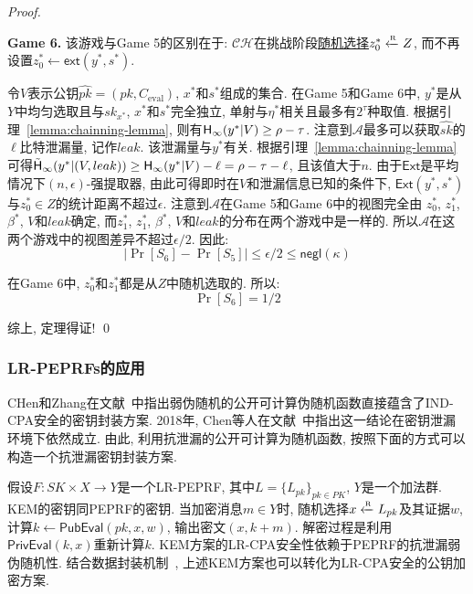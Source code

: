 \begin{proof}
\begin{trivlist}
\item \textbf{Game 6.} 该游戏与Game 5的区别在于: $\mathcal{CH}$在挑战阶段\underline{随机选择$z_0^* \xleftarrow{\textup{\tiny R}} Z$}, 而不再设置$z_0^* \leftarrow \mathsf{ext}(y^*, s^*)$. 

    令$V$表示公钥$\hat{pk} = (pk, C_\text{eval})$, $x^*$和$s^*$组成的集合. 
    在Game 5和Game 6中, $y^*$是从$Y$中均匀选取且与$sk_{x^*}$, $x^*$和$s^*$完全独立, 单射与$\eta^*$相关且最多有$2^\tau$种取值. 根据引理~\ref{lemma:chainning-lemma}, 则有$\mathsf{H}_\infty(y^*|V) \geq \rho - \tau$. 注意到$\mathcal{A}$最多可以获取$\hat{sk}$的$\ell$比特泄漏量, 记作$leak$. 该泄漏量与$y^*$有关. 根据引理~\ref{lemma:chainning-lemma}可得$\tilde{\mathsf{H}}_\infty(y^*|(V, leak)) \geq \mathsf{H}_\infty(y^*|V) - \ell = \rho - \tau - \ell$, 且该值大于$n$. 由于$\mathsf{Ext}$是平均情况下$(n, \epsilon)$-强提取器, 由此可得即时在$V$和泄漏信息已知的条件下, $\mathsf{Ext}(y^*, s^*)$与$z_0^* \in Z$的统计距离不超过$\epsilon$. 注意到$\mathcal{A}$在Game 5和Game 6中的视图完全由 $z_0^*$, $z_1^*$, $\beta^*$, $V$和$leak$确定, 而$z_1^*$, $z_1^*$, $\beta^*$, $V$和$leak$的分布在两个游戏中是一样的. 所以$\mathcal{A}$在这两个游戏中的视图差异不超过$\epsilon/2$. 因此: 
\begin{equation*}
    |\Pr[S_6] - \Pr[S_5]| \leq \epsilon/2 \leq \mathsf{negl}(\kappa)
\end{equation*}

在Game 6中, $z_0^*$和$z_1^*$都是从$Z$中随机选取的. 所以:
\begin{equation*}
    \Pr[S_6] = 1/2
\end{equation*}
\end{trivlist}

综上, 定理得证! \qed 
\end{proof}


\subsubsection{LR-PEPRFs的应用}
CHen和Zhang在文献~\cite{Chen-SCN-2014}中指出弱伪随机的公开可计算伪随机函数直接蕴含了IND-CPA安全的密钥封装方案. 2018年, Chen等人在文献~\cite{Chen-ASIACRYPT-2018}中指出这一结论在密钥泄漏环境下依然成立. 由此, 利用抗泄漏的公开可计算为随机函数, 按照下面的方式可以构造一个抗泄漏密钥封装方案.
 
假设$F: SK \times X \rightarrow Y$是一个LR-PEPRF, 其中$L = \{L_{pk}\}_{pk \in PK}$, 
$Y$是一个加法群. KEM的密钥同PEPRF的密钥. 当加密消息$m \in Y$时, 随机选择$x \xleftarrow{\textup{\tiny R}} L_{pk}$及其证据$w$, 计算$k \leftarrow \mathsf{PubEval}(pk, x, w)$, 输出密文$(x, k + m)$. 解密过程是利用$\mathsf{PrivEval}(k, x)$重新计算$k$. KEM方案的LR-CPA安全性依赖于PEPRF的抗泄漏弱伪随机性. 结合数据封装机制~\cite{CS-EUROCRYPT-2002}, 上述KEM方案也可以转化为LR-CPA安全的公钥加密方案.


